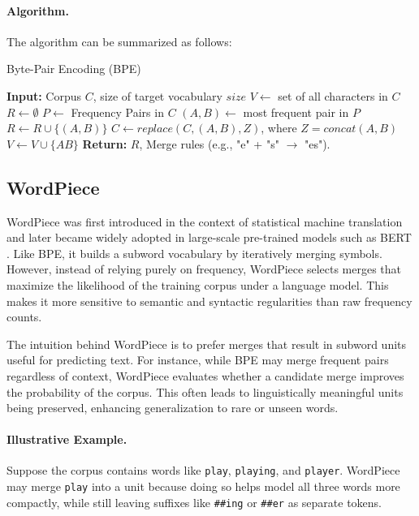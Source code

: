     \paragraph{Algorithm.}  
    The algorithm can be summarized as follows:

    \begin{algorithm}[H]
    \caption{Byte-Pair Encoding (BPE)}
    \begin{algorithmic}[1]
    \State \textbf{Input:} Corpus $C$, size of target vocabulary $size$
    \State $V \gets$ set of all characters in $C$
    \State $R \gets \emptyset$
        \State $P \gets$ Frequency Pairs in $C$
        \State $(A, B) \gets$ most frequent pair in $P$
        \State $R \gets R \cup \{(A, B)\}$
        \State $C \gets replace(C, (A,B), Z)$, where $Z = concat(A, B)$
        \State $V \gets V \cup \{AB\}$
    \EndWhile
    \State \textbf{Return:} $R$, Merge rules (e.g., "e" + "s" $\rightarrow$ "es").
    \end{algorithmic}
    \end{algorithm}


\subsection{WordPiece}\label{Section2.1.3}
    WordPiece was first introduced in the context of statistical machine translation \cite{schuster2012japanese} and later became widely adopted in large-scale pre-trained models such as BERT \cite{devlin2019bert}. Like BPE, it builds a subword vocabulary by iteratively merging symbols. However, instead of relying purely on frequency, WordPiece selects merges that maximize the likelihood of the training corpus under a language model. This makes it more sensitive to semantic and syntactic regularities than raw frequency counts.

    The intuition behind WordPiece is to prefer merges that result in subword units useful for predicting text. For instance, while BPE may merge frequent pairs regardless of context, WordPiece evaluates whether a candidate merge improves the probability of the corpus. This often leads to linguistically meaningful units being preserved, enhancing generalization to rare or unseen words.
    
    \paragraph{Illustrative Example.}
    Suppose the corpus contains words like \texttt{play}, \texttt{playing}, and \texttt{player}. WordPiece may merge \texttt{play} into a unit because doing so helps model all three words more compactly, while still leaving suffixes like \texttt{\#\#ing} or \texttt{\#\#er} as separate tokens.
